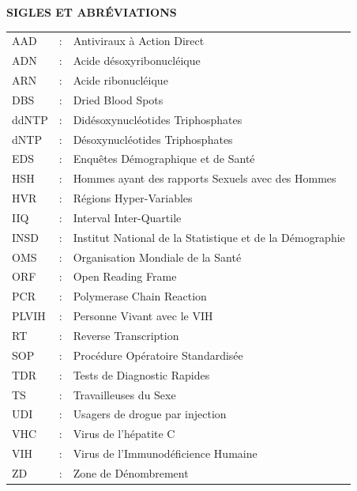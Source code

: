 \documentclass[a4paper,12pt]{article}
\begin{document}
\onehalfspacing
	
	\newpage
	\pagestyle{plain}
			
\cleardoublepage	
\tableofcontents
\thispagestyle{empty}
\cleardoublepage
{}
\setcounter{page}{1}

{}

\textbf{\huge SIGLES ET ABRÉVIATIONS}

\vspace{1.5cm}

\renewcommand{\arraystretch}{1.4}
\begin{tabular}{p{3cm} c p{10cm}}

AAD & : & Antiviraux à Action Direct \\ 
ADN & : & Acide désoxyribonucléique \\
ARN & : & Acide ribonucléique \\
DBS & : &  Dried Blood Spots \\
ddNTP & : & Didésoxynucléotides Triphosphates\\
dNTP & : & Désoxynucléotides Triphosphates\\
EDS & : & Enquêtes Démographique et de Santé \\
HSH & : & Hommes ayant des rapports Sexuels avec des Hommes\\
HVR& : & Régions Hyper-Variables \\
IIQ & : & Interval Inter-Quartile \\
INSD &: & Institut National de la Statistique et de la Démographie \\
OMS & : & Organisation Mondiale de la Santé \\
ORF & : & Open Reading Frame \\
PCR &: & Polymerase Chain Reaction \\
PLVIH & : & Personne Vivant avec le VIH \\
RT & : & Reverse Transcription \\
SOP & : &  Procédure Opératoire Standardisée \\
TDR & :  & Tests de Diagnostic Rapides \\
TS & : &   Travailleuses du Sexe \\
UDI & : & Usagers de drogue par injection \\
VHC & : & Virus de l’hépatite C \\
VIH & : & Virus de l'Immunodéficience Humaine \\
ZD & : & Zone de Dénombrement \\
 \end{tabular}
\clearpage
{}
{}
\end{document}
